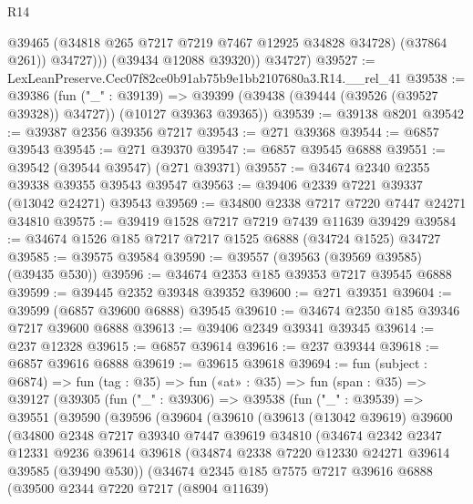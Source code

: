 \begin{lexlean}{R14}
\begin{coremodule}
                @39465
                (@34818 @265 @7217 @7219 @7467 @12925 @34828 @34728)
                (@37864 @261))
              @34727)))
        (@39434 @12088 @39320))
      @34727)
@39527 := LexLeanPreserve.Cec07f82ce0b91ab75b9e1bb2107680a3.R14.__rel_41
@39538 := @39386
    (fun ("_" : @39139) =>
    @39399 (@39438 (@39444 (@39526 (@39527 @39328)) @34727)) (@10127 @39363 @39365))
@39539 := @39138 @8201
@39542 := @39387 @2356 @39356 @7217
@39543 := @271 @39368
@39544 := @6857 @39543
@39545 := @271 @39370
@39547 := @6857 @39545 @6888
@39551 := @39542 (@39544 @39547) (@271 @39371)
@39557 := @34674 @2340 @2355 @39338 @39355 @39543 @39547
@39563 := @39406 @2339 @7221 @39337 (@13042 @24271) @39543
@39569 := @34800 @2338 @7217 @7220 @7447 @24271 @34810
@39575 := @39419 @1528 @7217 @7219 @7439 @11639 @39429
@39584 := @34674 @1526 @185 @7217 @7217 @1525 @6888 (@34724 @1525) @34727
@39585 := @39575 @39584
@39590 := @39557 (@39563 (@39569 @39585) (@39435 @530))
@39596 := @34674 @2353 @185 @39353 @7217 @39545 @6888
@39599 := @39445 @2352 @39348 @39352
@39600 := @271 @39351
@39604 := @39599 (@6857 @39600 @6888) @39545
@39610 := @34674 @2350 @185 @39346 @7217 @39600 @6888
@39613 := @39406 @2349 @39341 @39345
@39614 := @237 @12328
@39615 := @6857 @39614
@39616 := @237 @39344
@39618 := @6857 @39616 @6888
@39619 := @39615 @39618
@39694 := fun (subject : @6874) =>
  fun (tag : @35) =>
  fun («at» : @35) =>
  fun (span : @35) =>
  @39127
    (@39305
      (fun ("_" : @39306) =>
      @39538
        (fun ("_" : @39539) =>
        @39551
          (@39590
            (@39596
              (@39604
                (@39610
                  (@39613
                    (@13042 @39619)
                    @39600
                    (@34800
                      @2348
                      @7217
                      @39340
                      @7447
                      @39619
                      @34810
                      (@34674
                        @2342
                        @2347
                        @12331
                        @9236
                        @39614
                        @39618
                        (@34874 @2338 @7220 @12330 @24271 @39614 @39585 (@39490 @530))
                        (@34674
                          @2345
                          @185
                          @7575
                          @7217
                          @39616
                          @6888
                          (@39500
                            @2344
                            @7220
                            @7217
                            (@8904 @11639)

\end{coremodule}
\end{lexlean}
